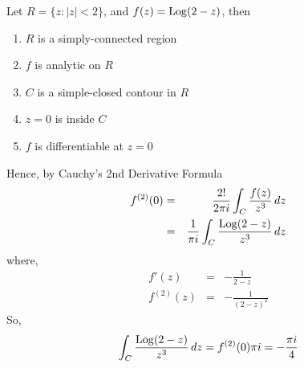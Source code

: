 \begin{itemize}
Let $R=\{ z: |z|<2 \}$, and $f(z)={\rm Log}(2-z)$, then
\begin{enumerate}
\item $R$ is a simply-connected region
\item $f$ is analytic on $R$
\item $C$ is a simple-closed contour in $R$
\item $z=0$ is inside $C$
\item $f$ is differentiable at $z=0$
\end{enumerate}
Hence, by Cauchy's 2nd Derivative Formula
\begin{eqnarray*}
f^{(2)}(0)
	&=& \frac{2!}{2\pi i} \int_C \frac{ f(z) }{ z^3 }\, dz \\
	&=& \frac{1}{\pi i} \int_C \frac{ {\rm Log}(2-z) }{ z^3 }\, dz
\end{eqnarray*}
where,
\begin{eqnarray*}
f'(z)	&=& -\frac{1}{2-z} \\
f^{(2)}(z)
	&=& -\frac{1}{(2-z)^2}
\end{eqnarray*}
So,
\[
\int_C \frac{ {\rm Log}(2-z) }{ z^3 }\,dz = f^{(2)}(0)\pi i = -\frac{\pi i}{4}
\]

\end{itemize}


